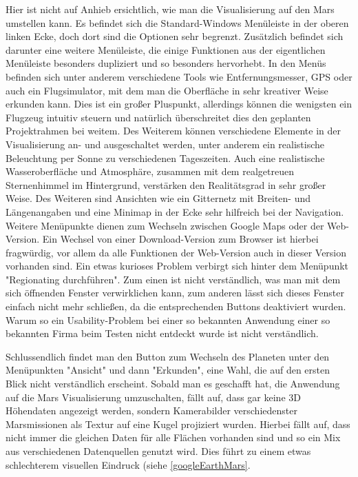Hier ist nicht auf Anhieb ersichtlich, wie man die Visualisierung auf den Mars umstellen kann. Es befindet sich die Standard-Windows Menüleiste in der oberen linken Ecke, doch dort sind die Optionen sehr begrenzt. Zusätzlich befindet sich darunter eine weitere Menüleiste, die einige Funktionen aus der eigentlichen Menüleiste besonders dupliziert und so besonders hervorhebt. In den Menüs befinden sich unter anderem verschiedene Tools wie Entfernungsmesser, GPS oder auch ein Flugsimulator, mit dem man die Oberfläche in sehr kreativer Weise erkunden kann. Dies ist ein großer Pluspunkt, allerdings können die wenigsten ein Flugzeug intuitiv steuern und natürlich überschreitet dies den geplanten Projektrahmen bei weitem. Des Weiterem können verschiedene Elemente in der Visualisierung an- und ausgeschaltet werden, unter anderem ein realistische Beleuchtung per Sonne zu verschiedenen Tageszeiten. Auch eine realistische Wasseroberfläche und Atmosphäre, zusammen mit dem realgetreuen Sternenhimmel im Hintergrund, verstärken den Realitätsgrad in sehr großer Weise. Des Weiteren sind Ansichten wie ein Gitternetz mit Breiten- und Längenangaben und eine Minimap in der Ecke sehr hilfreich bei der Navigation. Weitere Menüpunkte dienen zum Wechseln zwischen Google Maps oder der Web-Version. Ein Wechsel von einer Download-Version zum Browser ist hierbei fragwürdig, vor allem da alle Funktionen der Web-Version auch in dieser Version vorhanden sind. Ein etwas kurioses Problem verbirgt sich hinter dem Menüpunkt "Regionating durchführen". Zum einen ist nicht verständlich, was man mit dem sich öffnenden Fenster verwirklichen kann, zum anderen lässt sich dieses Fenster einfach nicht mehr schließen, da die entsprechenden Buttons deaktiviert wurden. Warum so ein Usability-Problem bei einer so bekannten Anwendung einer so bekannten Firma beim Testen nicht entdeckt wurde ist nicht verständlich.

Schlussendlich findet man den Button zum Wechseln des Planeten unter den Menüpunkten "Ansicht" und dann "Erkunden", eine Wahl, die auf den ersten Blick nicht verständlich erscheint. Sobald man es geschafft hat, die Anwendung auf die Mars Visualisierung umzuschalten, fällt auf, dass gar keine 3D Höhendaten angezeigt werden, sondern Kamerabilder verschiedenster Marsmissionen als Textur auf eine Kugel projiziert wurden. Hierbei fällt auf, dass nicht immer die gleichen Daten für alle Flächen vorhanden sind und so ein Mix aus verschiedenen Datenquellen genutzt wird. Dies führt zu einem etwas schlechterem visuellen Eindruck (siehe \ref{googleEarthMars}.

